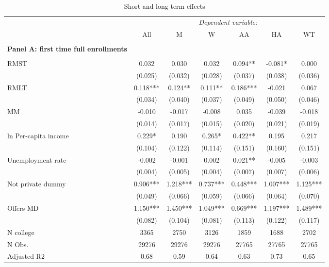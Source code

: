 \documentclass[12pt]{article}%
\begin{document}
\FloatBarrier
\begin{table}[!htbp] \centering 
  \begin{threeparttable}
      \caption{Short and long term effects }
   \label{table:sl}
  \small
\begin{tabular}{@{\extracolsep{-6pt}}lcccccc} 
\toprule
 & \multicolumn{6}{c}{\textit{ Dependent variable:}} \\ 
\cline{2-7} 
& All & M & W & AA & HA & WT \\
\midrule  \\[-1.8ex] 
\textbf{Panel A: first time full enrollments}\\ \\[-1.8ex] 
RMST & 0.032 & 0.030 & 0.032 & 0.094** & -0.081* & 0.000 \\
& (0.025) & (0.032) & (0.028) & (0.037) & (0.038) & (0.036) \\
RMLT & 0.118*** & 0.124** & 0.111** & 0.186*** & -0.021 & 0.067 \\
& (0.034) & (0.040) & (0.037) & (0.049) & (0.050) & (0.046) \\
MM & -0.010 & -0.017 & -0.008 & 0.035 & -0.039 & -0.018 \\
& (0.014) & (0.017) & (0.015) & (0.020) & (0.021) & (0.019) \\
ln Per-capita income & 0.229* & 0.190 & 0.265* & 0.422** & 0.195 &
0.217 \\
& (0.104) & (0.122) & (0.114) & (0.151) & (0.160) & (0.151) \\
Unemployment rate & -0.002 & -0.001 & 0.002 & 0.021** & -0.005 &
-0.003 \\
& (0.004) & (0.005) & (0.004) & (0.007) & (0.007) & (0.006) \\
Not private dummy & 0.906*** & 1.218*** & 0.737*** & 0.448*** & 1.007***
& 1.125*** \\
& (0.049) & (0.066) & (0.059) & (0.066) & (0.064) & (0.070) \\
Offers MD & 1.150*** & 1.450*** & 1.049*** & 0.669*** & 1.197*** &
1.489*** \\
& (0.082) & (0.104) & (0.081) & (0.113) & (0.122) & (0.117) \\
\hline
N college & 3365 & 2750 & 3126 & 1859 & 1688 & 2702 \\
N Obs. & 29276 & 29276 & 29276 & 27765 & 27765 & 27765 \\
Adjusted R2 & 0.68 & 0.59 & 0.64 & 0.63 & 0.73 & 0.65 \\


\end{tabular}
\end{threeparttable}
\end{table}
\end{document}
